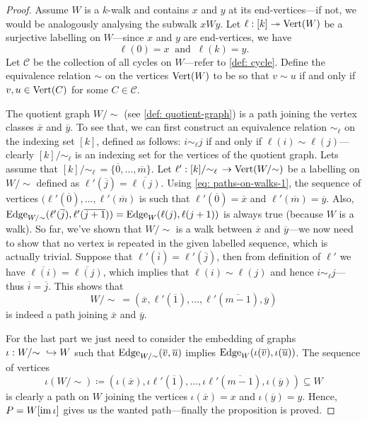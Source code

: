 \begin{proof}
Assume \(W\) is a \(k\)-walk and contains \(x\) and \(y\) at its
end-vertices---if not, we would be analogously analysing the subwalk
\(xWy\). Let \(\ell: [k] \twoheadrightarrow \operatorname{Vert}(W)\) be a surjective labelling on
\(W\)---since \(x\) and \(y\) are end-vertices, we have
\begin{equation}\label{eq: paths-on-walks-1}
  \ell(0) = x\ \text{ and }\ \ell(k) = y.
\end{equation}
Let \(\mathcal C\) be the
collection of all cycles on \(W\)---refer to \cref{def: cycle}. Define the
equivalence relation \(\sim\) on the vertices \(\operatorname{Vert}(W)\) to be so that \(v \sim
u\) if and only if \(v, u \in \operatorname{Vert}(C)\) for some \(C \in \mathcal C\).

The quotient graph \(W/{\sim}\) (see \cref{def: quotient-graph}) is a path
joining the vertex classes \(\overline x\) and \(\overline y\). To see that, we
can first construct an equivalence relation \(\sim_\ell\) on the indexing set
\([k]\), defined as follows: \(i \sim_\ell j\) if and only if
\(\ell(i) \sim \ell(j)\)---clearly \([k]/{\sim_\ell}\) is an indexing set for
the vertices of the quotient graph. Lets assume that
\([k]/{\sim_\ell}\, = \{\overline 0, \dots, \overline m\}\). Let
\(\ell': [k]/{\sim_\ell}\, \to \operatorname{Vert}(W/{\sim})\) be a labelling on
\(W/{\sim}\) defined as \(\ell'(\overline j) = \overline{\ell(j)}\). Using
\cref{eq: paths-on-walks-1}, the sequence of vertices
\((\ell'(\overline 0), \dots, \ell'(\overline m)\) is such that
\(\ell'(\overline 0) = \overline x\) and \(\ell'(\overline m) = \overline y\).
Also,
\(\operatorname{Edge}_{W/{\sim}}(\ell'(\overline j), \ell'(\overline{j + 1})) = \operatorname{Edge}_W(\ell(j),
\ell(j+1))\) is always true (because \(W\) is a walk). So far, we've shown that
\(W/{\sim}\) is a walk between \(\overline x\) and \(\overline y\)---we now
need to show that no vertex is repeated in the given labelled sequence, which is
actually trivial. Suppose that \(\ell'(\overline i) = \ell'(\overline j)\), then
from definition of \(\ell'\) we have
\(\overline{\ell(i)} = \overline{\ell(j)}\), which implies that
\(\ell(i) \sim \ell(j)\) and hence \(i \sim_\ell j\)---thus
\(\overline i = \overline j\). This shows that
\[
  W/{\sim}\ = (\overline x, \ell'(\overline 1), \dots, \ell'(\overline{m - 1}),
  \overline y)
\]
is indeed a path joining \(\overline x\) and \(\overline y\).

For the last part we just need to consider the embedding of graphs \(\iota: W/{\sim}\
\hookrightarrow W\) such that \(\operatorname{Edge}_{W/{\sim}}(\overline v, \overline u)\) implies
\(\operatorname{Edge}_W(\iota(\overline v), \iota(\overline u))\). The sequence of vertices
\[
  \iota(W/{\sim}) \coloneqq (\iota(\overline x), \iota\ell'(\overline 1), \dots,
  \iota \ell'(\overline{m-1}), \iota(\overline y)) \subseteq W
\]
is clearly a path on \(W\) joining the vertices \(\iota(\overline x) = x\) and
\(\iota(\overline y) = y\). Hence, \(P = W[\operatorname{im} \iota]\) gives us the wanted
path---finally the proposition is proved.
\end{proof}

